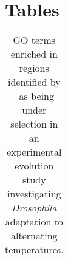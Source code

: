 \section*{Tables}
\begin{table}[H]
	\begin{tabular}{c}
		
	\end{tabular}
	\caption{GO terms enriched in regions identified by \comale\ as being under selection in an experimental evolution study investigating \emph{Drosophila} adaptation to alternating temperatures.}\label{tab:Fisher}
\end{table}